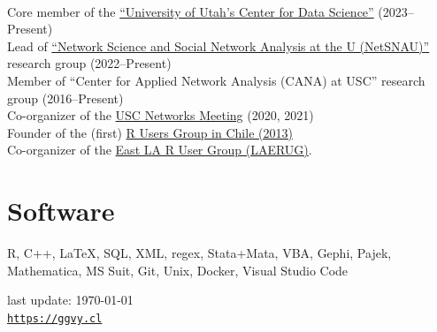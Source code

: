 \documentclass[letterpaper, 11pt]{article}
\def\footerlink{https://ggvy.cl}
\renewcommand{\textbf}[1]{{\bfseries\color{teal}#1}}
\begin{document}
\noindent \textbf{Misc}\\
Core member of the \href{https://datascience.utah.edu}{``University of Utah's Center for Data Science''} (2023--Present)\\

Lead of \href{https://netsci.utah.edu}{``Network Science and Social Network Analysis at the U (NetSNAU)''} research group (2022--Present)\\

Member of ``Center for Applied Network Analysis (CANA) at USC'' research group (2016--Present) \\

Co-organizer of the \href{https://networkanalysis.usc.edu}{USC Networks Meeting} (2020, 2021)\\

Founder of the (first) \href{https://www.meetup.com/useRchile/}{R Users Group in Chile (2013)}\\

Co-organizer of the \href{https://socalr.org}{East LA R User Group (LAERUG)}.

\section*{Software}

R, C++, \LaTeX, SQL, XML, regex, Stata+Mata, VBA, Gephi, Pajek, Mathematica, MS Suit, Git, Unix, Docker, Visual Studio Code

\bigskip

\begin{center}
 \begin{footnotesize}
   last update: \today \\
   \href{\footerlink}{\texttt{\footerlink}}
 \end{footnotesize}
\end{center}
\end{document}

